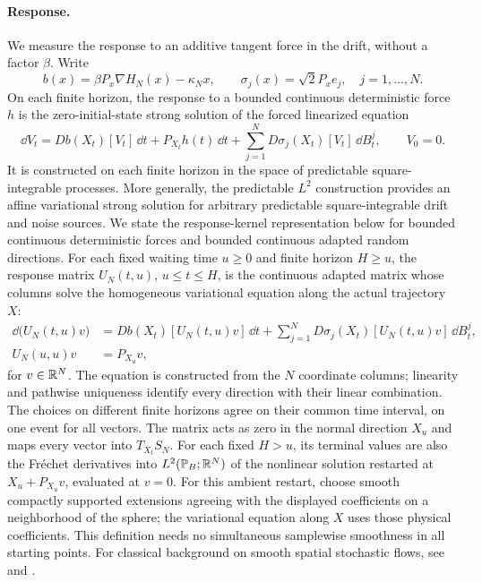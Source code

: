 \paragraph{Response.}
We measure the response to an additive tangent force in the drift, without a factor $\beta$. Write
\[
 b(x)=\beta P_x\nabla H_N(x)-\kappa_Nx,\qquad
 \sigma_j(x)=\sqrt2P_xe_j,\quad j=1,\dots,N.
\]
On each finite horizon, the response to a bounded continuous deterministic force $h$ is the zero-initial-state strong solution of the forced linearized equation
\begin{equation}\label{eq:perturbed-sde}
 \dd V_t=Db(X_t)[V_t]\,\dd t
 +P_{X_t}h(t)\,\dd t
 +\sum_{j=1}^ND\sigma_j(X_t)[V_t]\,\dd B^j_t,
 \qquad V_0=0.
\end{equation}
It is constructed on each finite horizon in the space of predictable square-integrable processes. More generally, the predictable $L^2$ construction provides an affine variational strong solution for arbitrary predictable square-integrable drift and noise sources. We state the response-kernel representation below for bounded continuous deterministic forces and bounded continuous adapted random directions.
For each fixed waiting time $u\ge0$ and finite horizon $H\ge u$, the response matrix $U_N(t,u)$, $u\le t\le H$, is the continuous adapted matrix whose columns solve the homogeneous variational equation along the actual trajectory $X$:
\begin{equation}\label{eq:response-matrix}
\begin{aligned}
 \dd\bigl(U_N(t,u)v\bigr)
 &=Db(X_t)[U_N(t,u)v]\,\dd t
 +\sum_{j=1}^ND\sigma_j(X_t)[U_N(t,u)v]\,\dd B^j_t,
 \\
 U_N(u,u)v&=P_{X_u}v,
\end{aligned}
\end{equation}
for $v\in\mathbb R^N$. The equation is constructed from the $N$ coordinate columns; linearity and pathwise uniqueness identify every direction with their linear combination. The choices on different finite horizons agree on their common time interval, on one event for all vectors. The matrix acts as zero in the normal direction $X_u$ and maps every vector into $T_{X_t}S_N$. For each fixed $H>u$, its terminal values are also the Fr\'echet derivatives into $L^2(\mathbb P_B;\mathbb R^N)$ of the nonlinear solution restarted at $X_u+P_{X_u}v$, evaluated at $v=0$. For this ambient restart, choose smooth compactly supported extensions agreeing with the displayed coefficients on a neighborhood of the sphere; the variational equation along $X$ uses those physical coefficients. This definition needs no simultaneous samplewise smoothness in all starting points. For classical background on smooth spatial stochastic flows, see \cite[Section~1, pp.~1022--1023]{kunita1987icm} and \cite[Section~4.6, Theorem~4.6.5, p.~173]{kunita1990}.

